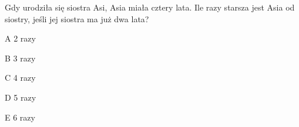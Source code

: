\begin{tresc}
Gdy urodziła się siostra Asi, Asia miała cztery lata. Ile razy starsza jest Asia od siostry, jeśli jej siostra ma już dwa lata?
\end{tresc}
\begin{wariant}{A} 2 razy \end{wariant}
\begin{wariant}{B} 3 razy \end{wariant}
\begin{wariant}{C} 4 razy \end{wariant}
\begin{wariant}{D} 5 razy \end{wariant}
\begin{wariant}{E} 6 razy \end{wariant}
